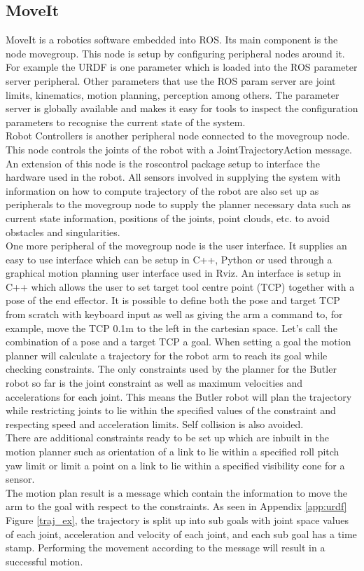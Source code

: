 \subsection{MoveIt}
MoveIt is a robotics software embedded into ROS. Its main component is the node movegroup. This node is setup by configuring peripheral nodes around it. For example the URDF is one parameter which is loaded into the ROS parameter server peripheral. Other parameters that use the ROS param server are joint limits, kinematics, motion planning, perception among others. The parameter server is globally available and makes it easy for tools to inspect the configuration parameters to recognise the current state of the system.\\
\indent Robot Controllers is another peripheral node connected to the movegroup node. This node controls the joints of the robot with a JointTrajectoryAction message. An extension of this node is the roscontrol package setup to interface the hardware used in the robot. All sensors involved in supplying the system with information on how to compute trajectory of the robot are also set up as peripherals to the movegroup node to supply the planner necessary data such as current state information, positions of the joints, point clouds, etc. to avoid obstacles and singularities.\\
\indent One more peripheral of the movegroup node is the user interface. It supplies an easy to use interface which can be setup in C++, Python or used through a graphical motion planning user interface used in Rviz. An interface is setup in C++ which allows the user to set target tool centre point (TCP) together with a pose of the end effector. It is possible to define both the pose and target TCP from scratch with keyboard input as well as giving the arm a command to, for example, move the TCP 0.1m to the left in the cartesian space. Let's call the combination of a pose and a target TCP a goal. When setting a goal the motion planner will calculate a trajectory for the robot arm to reach its goal while checking constraints. The only constraints used by the planner for the Butler robot so far is the joint constraint as well as maximum velocities and accelerations for each joint. This means the Butler robot will plan the trajectory while restricting joints to lie within the specified values of the constraint and respecting speed and acceleration limits. Self collision is also avoided.\\
\indent There are additional constraints ready to be set up which are inbuilt in the motion planner such as orientation of a link to lie within a specified roll pitch yaw limit or limit a point on a link to lie within a specified visibility cone for a sensor.\\
\indent The motion plan result is a message which contain the information to move the arm to the goal with respect to the constraints. As seen in Appendix \ref{app:urdf} Figure \ref{traj_ex}, the trajectory is split up into sub goals with joint space values of each joint, acceleration and velocity of each joint, and each sub goal has a time stamp. Performing the movement according to the message will result in a successful motion.


